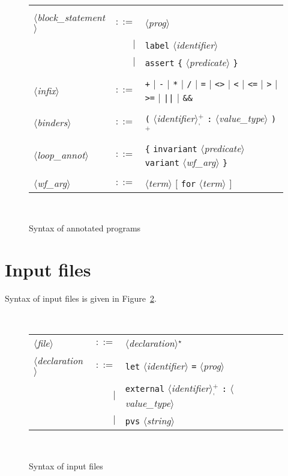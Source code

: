 \documentclass[a4paper,12pt]{report}
\newcommand{\te}[1]{\texttt{#1}}
\newcommand{\nt}[1]{$\langle$\textsl{#1}$\rangle$}
\newcommand{\etoile}{$^{\star}$}
\newcommand{\plus}{$^+$}
\newcommand{\plussep}[1]{$^+_#1$}
\begin{document}
\begin{figure}[htbp]
\begin{center}
\begin{tabular}{lrl}
      & & \\[0.1em]

  \nt{block\_statement}
    & $::=$ & \nt{prog} \\
      & $|$ & \te{label} \nt{identifier} \\
      & $|$ & \te{assert} \te{\{} \nt{predicate} \te{\}} \\

      & & \\[0.1em]
 
  \nt{infix}
    & $::=$ & \te{+} $|$ \te{-} $|$ \te{*} $|$ \te{/} $|$ 
              \te{=} $|$ \te{<>} $|$ 
              \te{<} $|$ \te{<=} $|$ \te{>} $|$ \te{>=} $|$
              \te{||} $|$ \te{\&\&} \\
      & & \\[0.1em]

  \nt{binders}
    & $::=$ & \te{(} \nt{identifier}\plussep{\te{,}} \te{:}
              \nt{value\_type} \te{)}\plus \\
  \\[0.1em]

  \nt{loop\_annot}
    & $::=$ & \te{\{} \te{invariant} \nt{predicate} 
              \te{variant} \nt{wf\_arg} \te{\}} \\
      & & \\[0.1em]

  \nt{wf\_arg} 
    & $::=$ & \nt{term} $[$ \te{for} \nt{term} $]$ \\

\end{tabular}\\
\hrulefill
\caption{Syntax of annotated programs}
\label{fig:caml}
\end{center}
\end{figure}

\section{Input files}

Syntax of input files is given in Figure~\ref{fig:input}.

\begin{figure}[htbp]
\begin{center}
\hrulefill\\
\begin{tabular}{lrl}
  \nt{file}
    & $::=$ & \nt{declaration}\etoile\
  \\[0.1em]

  \nt{declaration}
    & $::=$ & \te{let} \nt{identifier} \te{=} \nt{prog} \\
      & $|$ & \te{external} \nt{identifier}\plussep{\te{,}}
              \te{:} \nt{value\_type} \\
      & $|$ & \te{pvs} \nt{string}
\end{tabular}\\
\hrulefill
\caption{Syntax of input files}
\label{fig:input}
\end{center}           
\end{figure}
\end{document}
